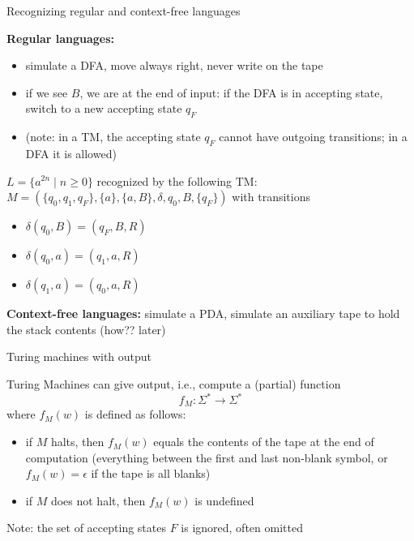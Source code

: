 \documentclass[handout]{beamer}
\begin{document}
\begin{frame}{Recognizing regular and context-free languages}

    \vspace{-8pt}
    \textbf{Regular languages:}
    \vspace{-6pt}
    \begin{itemize}
        \item simulate a DFA, move always right, never write on the tape
        \item if we see $B$, we are at the end of input: if the DFA is in accepting state, switch to a new accepting state $q_F$
        \item (note: in a TM, the accepting state $q_F$ cannot have outgoing transitions; in a DFA it is allowed) 
    \end{itemize}

    \begin{example}
        $L=\{a^{2n}\mid  n\geq 0\}$ recognized by the following TM: $M=(\{q_0,q_1,q_F\},\{a\},\{a,B\},\delta,q_0,B,\{q_F\})$ with transitions 
        \vspace{-6pt}
        \begin{itemize}
            \item $\delta(q_0,B)=(q_F,B,R)$
            \item $\delta(q_0,a)=(q_1,a,R)$
            \item $\delta(q_1,a)=(q_0,a,R)$
        \end{itemize}
    \end{example}
    
    \vspace{-10pt}
    \textbf{Context-free languages:} simulate a PDA, simulate an auxiliary tape to hold the stack contents (how?? later)

\end{frame}


\begin{frame}{Turing machines with output}

    Turing Machines can give output, i.e., compute a (partial) function
    $$
    f_M:\Sigma^*\to\Sigma^*
    $$
    where $f_M(w)$ is defined as follows:
    \begin{itemize}
        \item if $M$ halts, then $f_M(w)$ equals the \alert{contents of the tape} at the end of computation (everything between the first and last non-blank symbol, or $f_M(w)=\epsilon$ if the tape is all blanks) 
        \item if $M$ does not halt, then $f_M(w)$ is \alert{undefined} 
    \end{itemize} 

    Note: the set of accepting states $F$ is ignored, often omitted

\end{frame}
\end{document}
